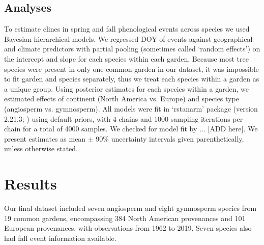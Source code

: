 \documentclass{article}
\begin{document}
\subsection{Analyses}
To estimate clines in spring and fall phenological events across species we used Bayesian hierarchical models. We regressed DOY of events against geographical and climate predictors with partial pooling (sometimes called `random effects') on the intercept and slope for each species within each garden. Because most tree species were present in only one common garden in our dataset, it was impossible to fit garden and species separately, thus we treat each species within a garden as a unique group. Using posterior estimates for each species within a garden, we estimated effects of continent (North America vs. Europe) and species type (angiosperm vs. gymnosperm). All models were fit in `rstanarm' package (version 2.21.3; \citealp{brilleman2018}) using default priors, with 4 chains and 1000 sampling iterations per chain for a total of 4000 samples. We checked for model fit by ... [ADD here]. We present estimates as mean $\pm$ 90\% uncertainty intervals given parenthetically, unless otherwise stated. 




\section{Results}
Our final dataset included seven angiosperm and eight gymnosperm species from 19 common gardens, encompassing 384 North American provenances and 101 European provenances, with observations from 1962 to 2019. Seven species also had fall event information available. 
\end{document}
